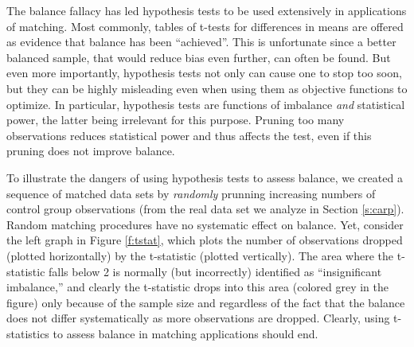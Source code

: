 \documentclass[11pt,titlepage]{article}
\begin{document}
The balance fallacy has led hypothesis tests to be used extensively in
applications of matching.  Most commonly, tables of t-tests for
differences in means are offered as evidence that balance has been
``achieved''.  This is unfortunate since a better balanced sample,
that would reduce bias even further, can often be found.  But even
more importantly, hypothesis tests not only can cause one to stop too
soon, but they can be highly misleading even when using them as
objective functions to optimize.  In particular, hypothesis tests are
functions of imbalance \emph{and} statistical power, the latter being
irrelevant for this purpose.  Pruning too many observations reduces
statistical power and thus affects the test, even if this pruning does
not improve balance.

To illustrate the dangers of using hypothesis tests to assess balance,
we created a sequence of matched data sets by \emph{randomly} prunning
increasing numbers of control group observations (from the real data
set we analyze in Section \ref{s:carp}).  Random matching procedures
have no systematic effect on balance.  Yet, consider the left graph in
Figure \ref{f:tstat}, which plots the number of observations dropped
(plotted horizontally) by the t-statistic (plotted vertically).  The
area where the t-statistic falls below 2 is normally (but incorrectly)
identified as ``insignificant imbalance,'' and clearly the t-statistic
drops into this area (colored grey in the figure) only because of the
sample size and regardless of the fact that the balance does not
differ systematically as more observations are dropped.  Clearly,
using t-statistics to assess balance in matching applications should
end.
\end{document}
